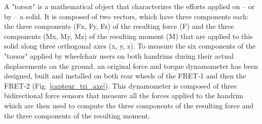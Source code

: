 A "torsor" is a mathematical object that characterizes the efforts applied on – or by – a solid. It is composed of two vectors, which have three components each: the three components (Fx, Fy, Fz) of the resulting force (F) and the three components (Mx, My, Mz) of the resulting moment (M) that are applied to this solid along three orthogonal axes (x, y, z). To measure the six components of the "torsor" applied by wheelchair users on both handrims during their actual displacements on the ground, an original force and torque dynamometer has been designed, built and installed on both rear wheels of the FRET-1 and then the FRET-2 (Fig. \ref{capteur_tri_axe}). This dynamometer is composed of three bidirectional force sensors that measure all the forces applied to the handrim which are then used to compute the three components of the resulting force and the three components of the resulting moment.

